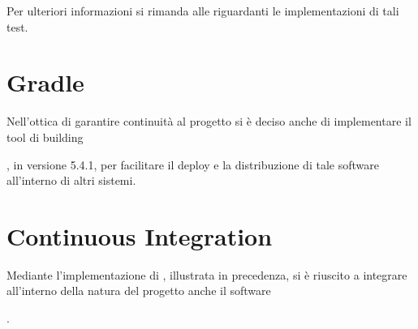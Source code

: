 \documentclass[letterpaper,10pt,italian,openany,oneside]{sphinxmanual}
\begin{document}
Per ulteriori informazioni si rimanda alle {\hyperref[\detokenize{test/packages::doc}]{}}  riguardanti le implementazioni di tali test.


\section{Gradle}
\label{\detokenize{introduzione:gradle}}
Nell’ottica di garantire continuità al progetto si è deciso anche di implementare il tool di building  %
\begin{footnote}[7]\sphinxAtStartFootnote
{}
%
\end{footnote}, in versione 5.4.1,
per facilitare il deploy e la distribuzione di tale software all’interno di altri sistemi.


\section{Continuous Integration}
\label{\detokenize{introduzione:continuous-integration}}\begin{quote}

\end{quote}

Mediante l’implementazione di , illustrata in precedenza, si è riuscito a integrare all’interno della natura del progetto
anche il software  %
\begin{footnote}[8]\sphinxAtStartFootnote
{}
%
\end{footnote}.

\noindent{}
\end{document}
